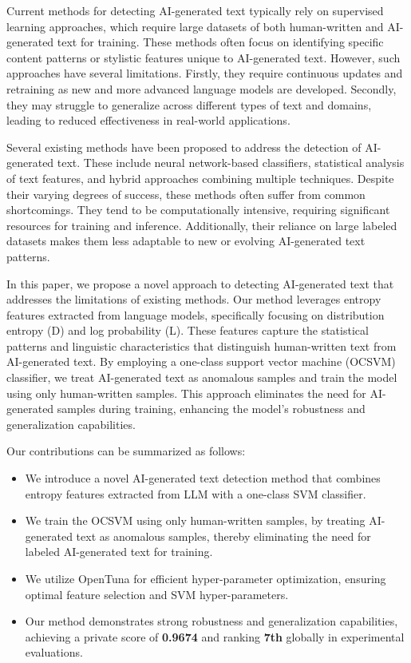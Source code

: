     Current methods for detecting AI-generated text typically rely on supervised learning approaches, which require large datasets of both human-written and AI-generated text for training. These methods often focus on identifying specific content patterns or stylistic features unique to AI-generated text. However, such approaches have several limitations. Firstly, they require continuous updates and retraining as new and more advanced language models are developed. Secondly, they may struggle to generalize across different types of text and domains, leading to reduced effectiveness in real-world applications.
    
    Several existing methods have been proposed to address the detection of AI-generated text. These include neural network-based classifiers, statistical analysis of text features, and hybrid approaches combining multiple techniques. Despite their varying degrees of success, these methods often suffer from common shortcomings. They tend to be computationally intensive, requiring significant resources for training and inference. Additionally, their reliance on large labeled datasets makes them less adaptable to new or evolving AI-generated text patterns.
    
    In this paper, we propose a novel approach to detecting AI-generated text that addresses the limitations of existing methods. Our method leverages entropy features extracted from language models, specifically focusing on distribution entropy (D) and log probability (L). These features capture the statistical patterns and linguistic characteristics that distinguish human-written text from AI-generated text. By employing a one-class support vector machine (OCSVM) classifier, we treat AI-generated text as anomalous samples and train the model using only human-written samples. This approach eliminates the need for AI-generated samples during training, enhancing the model's robustness and generalization capabilities.
    
    Our contributions can be summarized as follows:
    
    \begin{itemize}
    \item We introduce a novel AI-generated text detection method that combines entropy features extracted from LLM with a one-class SVM classifier.
    \item We train the OCSVM using only human-written samples, by treating AI-generated text as anomalous samples, thereby eliminating the need for labeled AI-generated text for training.
    \item We utilize OpenTuna for efficient hyper-parameter optimization, ensuring optimal feature selection and SVM hyper-parameters.
    \item Our method demonstrates strong robustness and generalization capabilities, achieving a private score of \textbf{0.9674} and ranking \textbf{7th} globally in experimental evaluations.
    \end{itemize}
    
